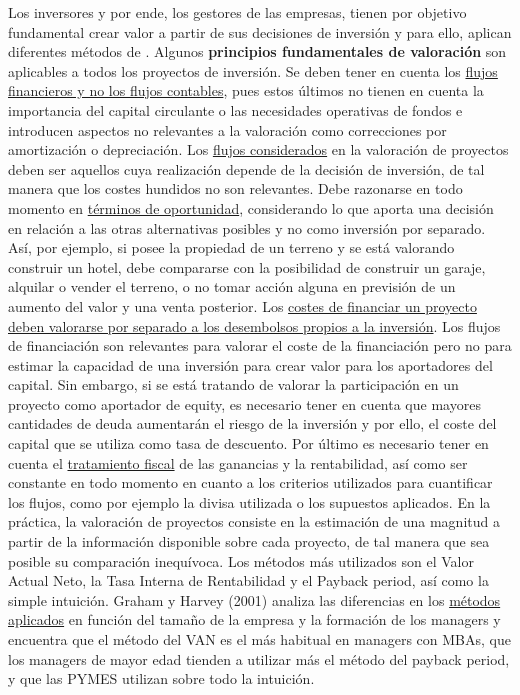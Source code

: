 \documentclass{nuevotema}
\begin{document}
Los inversores y por ende, los gestores de las empresas, tienen por objetivo fundamental crear valor a partir de sus decisiones de inversión y para ello, aplican diferentes métodos de . Algunos \textbf{principios fundamentales de valoración} son aplicables a todos los proyectos de inversión. Se deben tener en cuenta los \underline{flujos financieros y no los flujos contables}, pues estos últimos no tienen en cuenta la importancia del capital circulante o las necesidades operativas de fondos e introducen aspectos no relevantes a la valoración como correcciones por amortización o depreciación. Los \underline{flujos considerados} en la valoración de proyectos deben ser aquellos cuya realización depende de la decisión de inversión, de tal manera que los costes hundidos no son relevantes. Debe razonarse en todo momento en \underline{términos de oportunidad}, considerando lo que aporta una decisión en relación a las otras alternativas posibles y no como inversión por separado. Así, por ejemplo, si posee la propiedad de un terreno y se está valorando construir un hotel, debe compararse con la posibilidad de construir un garaje, alquilar o vender el terreno, o no tomar acción alguna en previsión de un aumento del valor y una venta posterior. Los \underline{costes de financiar un proyecto deben valorarse por separado a los desembolsos propios a la inversión}. Los flujos de financiación son relevantes para valorar el coste de la financiación pero no para estimar la capacidad de una inversión para crear valor para los aportadores del capital. Sin embargo, si se está tratando de valorar la participación en un proyecto como aportador de equity, es necesario tener en cuenta que mayores cantidades de deuda aumentarán el riesgo de la inversión y por ello, el coste del capital que se utiliza como tasa de descuento. Por último es necesario tener en cuenta el \underline{tratamiento fiscal} de las ganancias y la rentabilidad, así como ser constante en todo momento en cuanto a los criterios utilizados para cuantificar los flujos, como por ejemplo la divisa utilizada o los supuestos aplicados. En la práctica, la valoración de proyectos consiste en la estimación de una magnitud a partir de la información disponible sobre cada proyecto, de tal manera que sea posible su comparación inequívoca. Los métodos más utilizados son el Valor Actual Neto, la Tasa Interna de Rentabilidad y el Payback period, así como la simple intuición. Graham y Harvey (2001) analiza las diferencias en los \underline{métodos aplicados} en función del tamaño de la empresa y la formación de los managers y encuentra que el método del VAN es el más habitual en managers con MBAs, que los managers de mayor edad tienden a utilizar más el método del payback period, y que las PYMES utilizan sobre todo la intuición.
\end{document}
